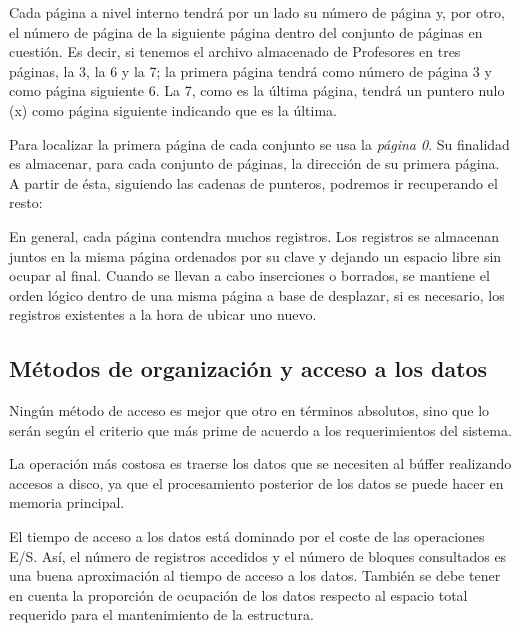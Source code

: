 \documentclass[10pt,a4paper,spanish]{report}
\begin{document}
Cada página a nivel interno tendrá por un lado su número de página y, por otro, el número de página de la siguiente página dentro del conjunto de páginas en cuestión. Es decir, si tenemos el archivo almacenado de Profesores en tres páginas, la 3, la 6 y la 7; la primera página tendrá como número de página 3 y como página siguiente 6. La 7, como es la última página, tendrá un puntero nulo (x) como página siguiente indicando que es la última.

Para localizar la primera página de cada conjunto se usa la \textcolor[rgb]{1,0.2,0.3}{\textit{página 0}}. Su finalidad es almacenar, para cada conjunto de páginas, la dirección de su primera página. A partir de ésta, siguiendo las cadenas de punteros, podremos ir recuperando el resto:

\begin{center}

\end{center}

En general, cada página contendra muchos registros. Los registros se almacenan juntos en la misma página ordenados por su clave y dejando un espacio libre sin ocupar al final. Cuando se llevan a cabo inserciones o borrados, se mantiene el orden lógico dentro de una misma página a base de desplazar, si es necesario, los registros existentes a la hora de ubicar uno nuevo.



\textcolor[rgb]{1,0.2,0.3}{\section{Métodos de organización y acceso a los datos}}
Ningún método de acceso es mejor que otro en términos absolutos, sino que lo serán según el criterio que más prime de acuerdo a los requerimientos del sistema.

La operación más costosa es traerse los datos que se necesiten al búffer realizando accesos a disco, ya que el procesamiento posterior de los datos se puede hacer en memoria principal.

El tiempo de acceso a los datos está dominado por el coste de las operaciones E/S. Así, el número de registros accedidos y el número de bloques consultados es una buena aproximación al tiempo de acceso a los datos. También se debe tener en cuenta la proporción de ocupación de los datos respecto al espacio total requerido para el mantenimiento de la estructura.
\end{document}

